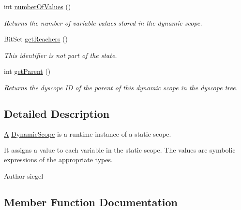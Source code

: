 \begin{DoxyCompactItemize}
int \hyperlink{interfaceedu_1_1udel_1_1cis_1_1vsl_1_1civl_1_1state_1_1IF_1_1DynamicScope_ae67e10d567c062e675ce0a2865627336}{number\+Of\+Values} ()
\begin{DoxyCompactList}\small\item\em Returns the number of variable values stored in the dynamic scope. \end{DoxyCompactList}\item 
Bit\+Set \hyperlink{interfaceedu_1_1udel_1_1cis_1_1vsl_1_1civl_1_1state_1_1IF_1_1DynamicScope_aca96dfb76322be4928d42b03036cd41b}{get\+Reachers} ()
\begin{DoxyCompactList}\small\item\em This identifier is not part of the state. \end{DoxyCompactList}\item 
int \hyperlink{interfaceedu_1_1udel_1_1cis_1_1vsl_1_1civl_1_1state_1_1IF_1_1DynamicScope_a0d8df1d26fa6e2ae1626b9ec248ec267}{get\+Parent} ()
\begin{DoxyCompactList}\small\item\em Returns the dyscope I\+D of the parent of this dynamic scope in the dyscope tree. \end{DoxyCompactList}\end{DoxyCompactItemize}


\subsection{Detailed Description}
\hyperlink{structA}{A} \hyperlink{interfaceedu_1_1udel_1_1cis_1_1vsl_1_1civl_1_1state_1_1IF_1_1DynamicScope}{Dynamic\+Scope} is a runtime instance of a static scope. 

It assigns a value to each variable in the static scope. The values are symbolic expressions of the appropriate types.

\begin{DoxyAuthor}{Author}
siegel 
\end{DoxyAuthor}


\subsection{Member Function Documentation}
\hypertarget{interfaceedu_1_1udel_1_1cis_1_1vsl_1_1civl_1_1state_1_1IF_1_1DynamicScope_a0d8df1d26fa6e2ae1626b9ec248ec267}{}
